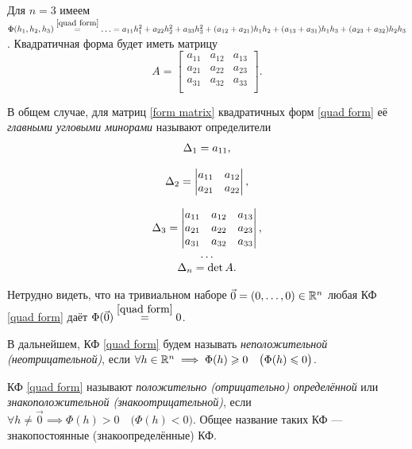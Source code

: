 \documentclass[../../main.tex]{subfiles}
\begin{document}
	\begin{exmp}
		Для $n = 3$ имеем $\Phi(h_1, h_2, h_3) \stk{quad form}{=} \ldots
		= a_{1 1} h_1^2 + a_{2 2} h_2^2 + a_{3 3} h_3^2
		+ (a_{1 2} + a_{2 1}) h_1 h_2 + (a_{1 3} + a_{3 1}) h_1 h_3
		+ (a_{2 3} + a_{3 2}) h_2 h_3$.
		Квадратичная форма будет иметь матрицу
		\[
			A =
			\begin{bmatrix}
				a_{1 1} & a_{1 2} & a_{1 3} \\
				a_{2 1} & a_{2 2} & a_{2 3} \\
				a_{3 1} & a_{3 2} & a_{3 3} \\
			\end{bmatrix}.
		\]
	\end{exmp}
	В общем случае, для матриц \eqref{form matrix} квадратичных форм
	\eqref{quad form} её \emph{главными угловыми минорами} называют
	определители
	\begin{equation}
	\label{main corner minors}
	\begin{array}{c}
		\Delta_1 = a_{1 1}, \\ \\
		\Delta_2 =
		\begin{vmatrix}
			a_{1 1} & a_{1 2} \\
			a_{2 1} & a_{2 2} \\
		\end{vmatrix}, \\ \\
		\Delta_3 =
		\begin{vmatrix}
			a_{1 1} & a_{1 2} & a_{1 3} \\
			a_{2 1} & a_{2 2} & a_{2 3} \\
			a_{3 1} & a_{3 2} & a_{3 3} \\
		\end{vmatrix}, \\
		\dots \\
		\Delta_n = \det A.
    \end{array}
	\end{equation}
	
	Нетрудно видеть, что на тривиальном наборе
	$\vec{0} = (0, \ldots, 0) \in \mathbb{R}^n$ любая КФ \eqref{quad form}
	даёт $\Phi(\vec{0}) \stk{quad form}{=} 0$.
	
	В дальнейшем, КФ \eqref{quad form} будем называть \emph{неположительной
	(неотрицательной)}, если $\forall h \in \mathbb{R}^n \implies
	\Phi(h) \geqslant 0
	\quad \big(\Phi(h) \leqslant 0\big)$.
	
	КФ \eqref{quad form} называют \emph{положительно (отрицательно) определённой}
	или \emph{знакоположительной (знакоотрицательной)},
	если $\forall h \ne \vec{0} \implies \Phi(h) > 0 \quad \big(\Phi(h) < 0\big)$.
	Общее название таких КФ --- знакопостоянные (знакоопределённые) КФ.
	
\end{document}
